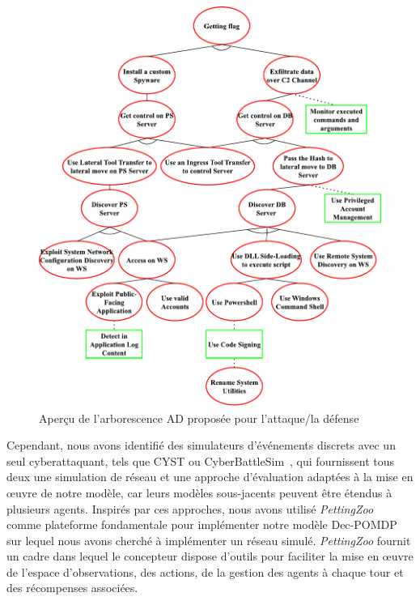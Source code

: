 \begin{figure}
  \centering
  \includegraphics[width=\linewidth]{figures/ADTree.pdf}
  \caption{Aperçu de l'arborescence AD proposée pour l'attaque/la défense}
  \label{fig:ADTree}
\end{figure}

Cependant, nous avons identifié des simulateurs d'événements discrets avec un seul cyberattaquant, tels que CYST\cite{drasar_session-level_2020} ou CyberBattleSim~\cite{cyberbattlesim}, qui fournissent tous deux une simulation de réseau et une approche d'évaluation adaptées à la mise en œuvre de notre modèle, car leurs modèles sous-jacents peuvent être étendus à plusieurs agents. Inspirés par ces approches, nous avons utilisé \textit{PettingZoo}~\cite{terry2020pettingzoo} comme plateforme fondamentale pour implémenter notre modèle Dec-POMDP sur lequel nous avons cherché à implémenter un réseau simulé. \textit{PettingZoo} fournit un cadre dans lequel le concepteur dispose d'outils pour faciliter la mise en œuvre de l'espace d'observations, des actions, de la gestion des agents à chaque tour et des récompenses associées.


